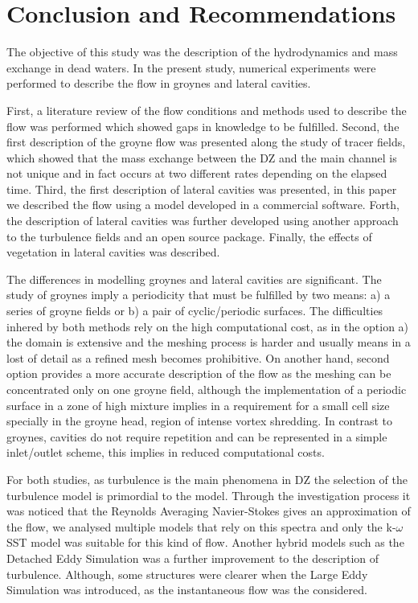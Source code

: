 \chapter{Conclusion and Recommendations}
\label{chap:conclusion}

The objective of this study was the description of the hydrodynamics and mass exchange in dead waters. In the present study, numerical experiments were performed to describe the flow in groynes and lateral cavities.

First, a literature review of the flow conditions and methods used to describe the flow was performed which showed gaps in knowledge to be fulfilled. Second, the first description of the groyne flow was presented along the study of tracer fields, which showed that the mass exchange between the DZ and the main channel is not unique and in fact occurs at two different rates depending on the elapsed time. Third, the first description of lateral cavities was presented, in this paper we described the flow using a model developed in a commercial software. Forth, the description of lateral cavities was further developed using another approach to the turbulence fields and an open source package. Finally, the effects of vegetation in lateral cavities was described.

The differences in modelling groynes and lateral cavities are significant. The study of groynes imply a periodicity that must be fulfilled by two means: a) a series of groyne fields or b) a pair of cyclic/periodic surfaces. The difficulties inhered by both methods rely on the high computational cost, as in the option a) the domain is extensive and the meshing process is harder and usually means in a lost of detail as a refined mesh becomes prohibitive. On another hand, second option provides a more accurate description of the flow as the meshing can be concentrated only on one groyne field, although the implementation of a periodic surface in a zone of high mixture implies in a requirement for a small cell size specially in the groyne head, region of intense vortex shredding. In contrast to groynes, cavities do not require repetition and can be represented in a simple inlet/outlet scheme, this implies in reduced computational costs.

For both studies, as turbulence is the main phenomena in DZ the selection of the turbulence model is primordial to the model. Through the investigation process it was noticed that the Reynolds Averaging Navier-Stokes gives an approximation of the flow, we analysed multiple models that rely on this spectra and only the k-$\omega$ SST model was suitable for this kind of flow. Another hybrid models such as the Detached Eddy Simulation was a further improvement to the description of turbulence. Although, some structures were clearer when the Large Eddy Simulation was introduced, as the instantaneous flow was the considered.
